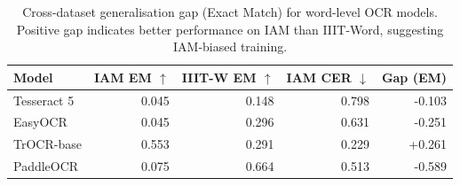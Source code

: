 \begin{table}[ht]
\centering
\small
\caption{Cross-dataset generalisation gap (Exact Match) for word-level OCR models. Positive gap indicates better performance on IAM than IIIT-Word, suggesting IAM-biased training.}
\label{tab:ablation_cross_dataset}
\begin{tabular}{lrrrr}
\hline
Model & IAM EM $\uparrow$ & IIIT-W EM $\uparrow$ & IAM CER $\downarrow$ & Gap (EM) \\
\hline
Tesseract 5 & 0.045 & 0.148 & 0.798 & -0.103 \\
EasyOCR & 0.045 & 0.296 & 0.631 & -0.251 \\
TrOCR-base & 0.553 & 0.291 & 0.229 & +0.261 \\
PaddleOCR & 0.075 & 0.664 & 0.513 & -0.589 \\
\hline
\end{tabular}
\end{table}
